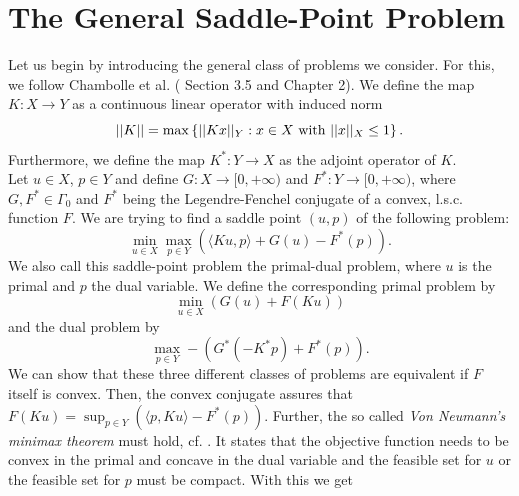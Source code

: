 \documentclass[abstracton]{scrreprt}
\begin{document}
    \section{The General Saddle-Point Problem} %
    \label{sec:the_general_saddle_point_problem}
        
        Let us begin by introducing the general class of problems we consider. For this, we follow Chambolle et al. (\cite{Chambolle-et-al-10} Section 3.5 and \cite{Chambolle10afirst-order} Chapter 2). We define the map $K: X \longrightarrow Y$ as a continuous linear operator with induced norm
            $$
                ||K|| = \max \left\{ ||Kx||_{Y} : x \in X \,\, \textnormal{with} \,\, ||x||_{X} \le 1 \right\}.
            $$
        Furthermore, we define the map $K^{\ast}: Y \longrightarrow X$ as the adjoint operator of $K$.\\
        Let $u \in X$, $p \in Y$ and define $G: X \longrightarrow [0, +\infty)$ and $F^{\ast}: Y \longrightarrow [0, +\infty)$, where $G, F^{\ast} \in \Gamma_{0}$ and $F^{\ast}$ being the Legendre-Fenchel conjugate of a convex, l.s.c. function $F$. We are trying to find a saddle point $(u, p)$ of the following problem:
            \begin{equation}
                \min_{u \in X} \max_{p \in Y} \left( \langle Ku, p \rangle + G(u) - F^{\ast}(p) \right).
                \label{eq:the_saddle_point_problem}
            \end{equation}
        We also call this saddle-point problem the primal-dual problem, where $u$ is the primal and $p$ the dual variable. We define the corresponding primal problem by
            \begin{equation}
                \min_{u \in X} \left( G(u) + F(Ku) \right)
                \label{eq:primal_problem}
            \end{equation}
        and the dual problem by
            \begin{equation}
                \max_{p \in Y} -(G^{\ast}(-K^{\ast}p) + F^{\ast}(p)).
                \label{eq:dual_problem}
            \end{equation}
        We can show that these three different classes of problems are equivalent if $F$ itself is convex. Then, the convex conjugate assures that $F(Ku) = \sup_{p \in Y} \left( \langle p, Ku \rangle - F^{\ast}(p) \right)$. Further, the so called \textit{Von Neumann's minimax theorem} must hold, cf. \cite{Zeidler}. It states that the objective function needs to be convex in the primal and concave in the dual variable and the feasible set for $u$ or the feasible set for $p$ must be compact. With this we get
\end{document}
